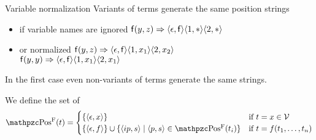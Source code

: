 \begin{example}{Variable normalization}
	Variants of terms generate the same position strings
	\begin{itemize}
		\item if variable names are ignored
		\hfill \( \mathsf{f}(y,z) \Rightarrow
		\langle\epsilon,\mathsf{f}\rangle
		\langle1,*\rangle
		\langle2,*\rangle
		 \)

		\item or normalized
		\hfill \( \mathsf{f}(y,z) \Rightarrow
		\langle\epsilon,\mathsf{f}\rangle
		\langle1,x_1\rangle
		\langle2,x_2\rangle \)
		\\
		\hfill \( \mathsf{f}(y,y) \Rightarrow
		\langle\epsilon,\mathsf{f}\rangle
		\langle1,x_1\rangle
		\langle2,x_1\rangle
		 \)
	\end{itemize}

	In the first case even non-variants of terms generate the same strings.
\end{example}


\begin{definition} We define the set of 
	\begin{gather*}
	\posS(t) =
	\begin{cases}
	\{ \ANGLES{\epsilon,x} \}
	& \text{if }t=x\in\SIGV \\
	\{ \ANGLES{\epsilon, f} \} \cup \{ \ANGLES{ip,s}\mid \ANGLES{p,s} \in\posS(t_i)\}
	&\text{if }t=f(t_1,\ldots,t_n)
	\end{cases}
	\end{gather*}
\end{definition}

